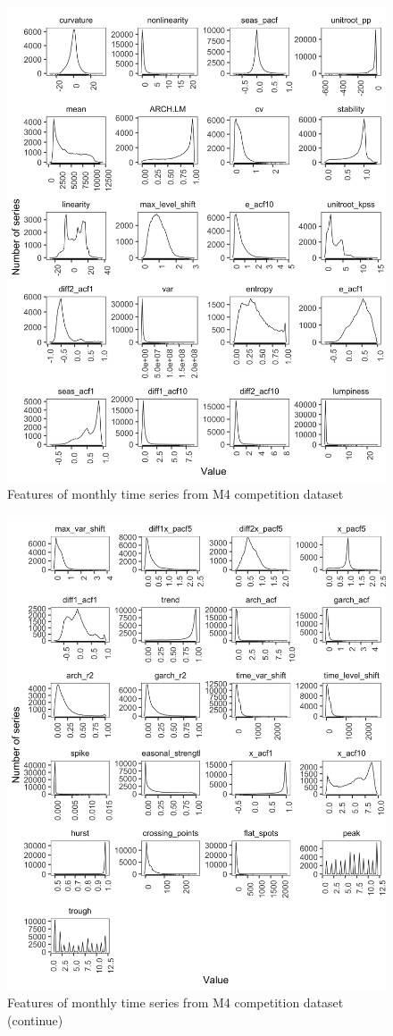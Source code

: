 \documentclass[]{elsarticle} %
\begin{document}
\begin{figure}[H]

{\centering \includegraphics[width=0.7\linewidth]{img/300dpi/featurets1} 

}

\caption{Features of monthly time series from M4 competition dataset}\label{fig:feature1}
\end{figure}

\begin{figure}[H]

{\centering \includegraphics[width=0.7\linewidth]{img/300dpi/featurets2} 

}

\caption{Features of monthly time series from M4 competition dataset (continue)}\label{fig:feature2}
\end{figure}
\end{document}
